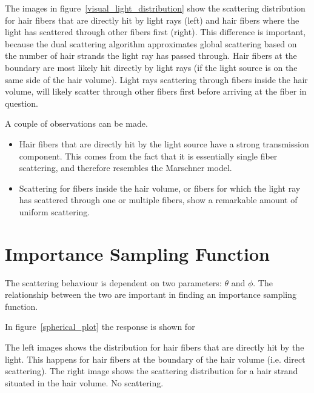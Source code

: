 \documentclass[11pt,a4paper]{report}
\begin{document}
The images in figure~\ref{visual_light_distribution} show the scattering distribution for hair fibers that are directly hit by light rays (left) and hair fibers where the light has scattered through other fibers first (right). This difference is important,  because the dual scattering algorithm approximates global scattering based on the number of hair strands the light ray has passed through. Hair fibers at the boundary are most likely hit directly by light rays (if the light source is on the same side of the hair volume). Light rays scattering through fibers inside the hair volume, will likely scatter through other fibers first before arriving at the fiber in question.

A couple of observations can be made.
\begin{itemize}
\item Hair fibers that are directly hit by the light source have a strong transmission component. This comes from the fact that it is essentially single fiber scattering, and therefore resembles the Marschner model.
\item Scattering for fibers inside the hair volume, or fibers for which the light ray has scattered through one or multiple fibers, show a remarkable amount of uniform scattering.
\end{itemize}

\section{Importance Sampling Function}

The scattering behaviour is dependent on two parameters: $\theta$ and $\phi$. The relationship between the two are important in finding an importance sampling function.

In figure~\ref{spherical_plot} the response is shown for 


 The left images shows the distribution for hair fibers that are directly hit by the light.  This happens for hair fibers at the boundary of the hair volume (i.e. direct scattering). The right image shows the scattering distribution for a hair strand situated in the hair volume. No scattering.
\end{document}
